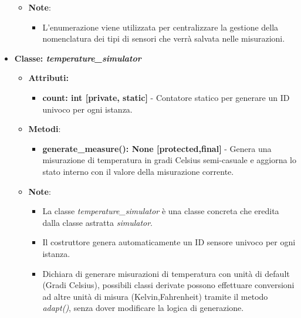 \begin{itemize}
\begin{itemize}
        \item \textbf{Note}:
        \begin{itemize}
            \item L'enumerazione viene utilizzata per centralizzare la gestione della nomenclatura dei tipi di sensori che verrà salvata nelle misurazioni.
        \end{itemize}
    \end{itemize}
        
    \item{\textbf{Classe: \textit{temperature\_simulator}}}
    \begin{itemize}
        \item \textbf{Attributi:}
        \begin{itemize}
            \item \textbf{count: int [private, static]} - Contatore statico per generare un ID univoco per ogni istanza.
        \end{itemize}
        \item\textbf{Metodi}: 
        \begin{itemize}
            \item \textbf{generate\_measure(): None [protected,final]} - Genera una misurazione di temperatura in gradi Celsius semi-casuale e aggiorna lo stato interno con il valore della misurazione corrente.
        \end{itemize}
        \item\textbf{Note}:
        \begin{itemize}
            \item La classe \textit{temperature\_simulator} è una classe concreta che eredita dalla classe astratta \textit{simulator}.
            \item Il costruttore genera automaticamente un ID sensore univoco per ogni istanza.
            \item Dichiara di generare misurazioni di temperatura con unità di default (Gradi Celsius), possibili classi derivate possono effettuare conversioni ad altre unità di misura (Kelvin,Fahrenheit) tramite il metodo \textit{adapt()}, senza dover modificare la logica di generazione.
        \end{itemize}
    \end{itemize}
    

\end{itemize}
